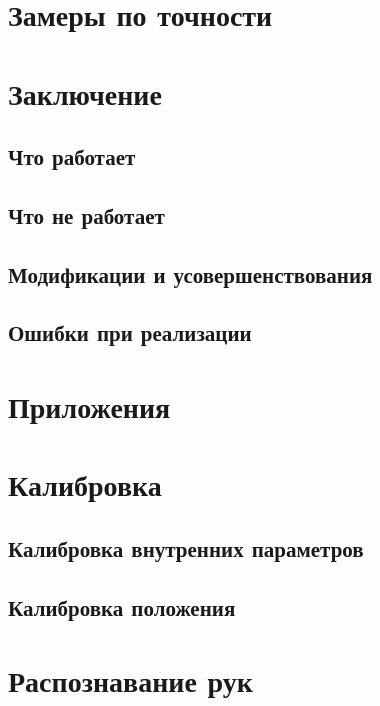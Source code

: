 \documentclass[12pt, a4paper]{article}
\begin{document}
\section{Замеры по точности}


\section{Заключение}

\subsection{Что работает}
\subsection{Что не работает}
\subsection{Модификации и усовершенствования}
\subsection{Ошибки при реализации}

\section{Приложения}

\section{Калибровка}
\subsection{Калибровка внутренних параметров}



\subsection{Калибровка положения}
 

\section{Распознавание рук}
\end{document}
